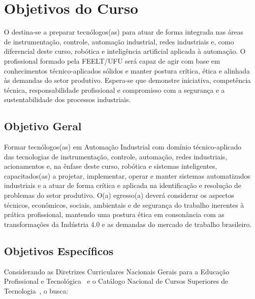 \chapter{Objetivos do Curso}
\label{chp:objetivos}

O \ppccurso destina-se a preparar tecnólogos(as) para atuar de forma integrada nas áreas de instrumentação, controle, automação industrial, redes industriais e, como diferencial deste curso, robótica e inteligência artificial aplicada à automação. O profissional formado pela FEELT/UFU será capaz de agir com base em conhecimentos técnico-aplicados sólidos e manter postura crítica, ética e alinhada às demandas do setor produtivo. Espera-se que demonstre iniciativa, competência técnica, responsabilidade profissional e compromisso com a segurança e a sustentabilidade dos processos industriais.

\section{Objetivo Geral}

Formar tecnólogos(as) em Automação Industrial com domínio técnico-aplicado das tecnologias de instrumentação, controle, automação, redes industriais, acionamentos e, na ênfase deste curso, robótica e sistemas inteligentes, capacitados(as) a projetar, implementar, operar e manter sistemas automatizados industriais e a atuar de forma crítica e aplicada na identificação e resolução de problemas do setor produtivo. O(a) egresso(a) deverá considerar os aspectos técnicos, econômicos, sociais, ambientais e de segurança do trabalho inerentes à prática profissional, mantendo uma postura ética em consonância com as transformações da Indústria 4.0 e as demandas do mercado de trabalho brasileiro.

\section{Objetivos Específicos}

Considerando as Diretrizes Curriculares Nacionais Gerais para a Educação Profissional e Tecnológica~\cite{cne_cp_1_2021} e o Catálogo Nacional de Cursos Superiores de Tecnologia~\cite{mec_cncst_2024}, o \ppccurso busca:

